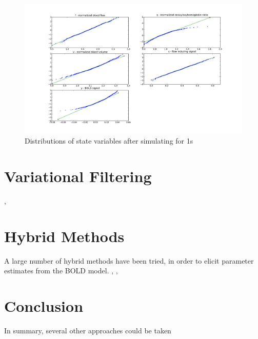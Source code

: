 \begin{figure}
\includegraphics[trim=6cm .75cm 6cm .75cm,width=16cm]{images/gauss_step_1sec_3sigma.pdf}
\caption{Distributions of state variables after simulating for 1s}
\label{fig:trans1s}
\end{figure}

\section{Variational Filtering}
\cite{Friston2008}, \cite{Friston2008b}

\section{Hybrid Methods}
A large number of hybrid methods have been tried, in order to elicit 
parameter estimates from the BOLD model. \cite{Vakorin2007},
\cite{Johnston2007}, \cite{Hu2009}

\section{Conclusion}
In summary, several other approaches could be taken 
